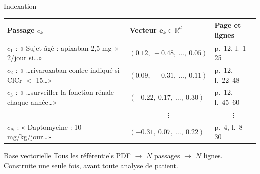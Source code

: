 \documentclass{beamer}
\begin{document}
\begin{frame}{Indexation}
  \centering
  \footnotesize
  \renewcommand{\arraystretch}{1.4}
  \begin{tabular}{>{\raggedright\arraybackslash}p{4.5cm}ll}
    \toprule
    \textbf{Passage $c_k$} & \textbf{Vecteur $\mathbf{e}_k \in \mathbb{R}^d$} & \textbf{Page et lignes} \\
    \midrule
    $c_1$ : « Sujet âgé : apixaban 2,5 mg $\times$ 2/jour si\dots » & $(0.12,\ -0.48,\ \dots,\ 0.05)$ & p.~12, l.~1--25 \\
    $c_2$ : « \dots rivaroxaban contre-indiqué si ClCr $<$ 15\dots » & $(0.09,\ -0.31,\ \dots,\ 0.11)$ & p.~12, l.~22--48 \\
    $c_3$ : « \dots surveiller la fonction rénale chaque année\dots » & $(-0.22,\ 0.17,\ \dots,\ 0.30)$ & p.~12, l.~45--60 \\
    \multicolumn{1}{c}{$\vdots$} & \multicolumn{1}{c}{$\vdots$} & \multicolumn{1}{c}{$\vdots$} \\
    $c_N$ : « Daptomycine : 10 mg/kg/jour\dots » & $(-0.31,\ 0.07,\ \dots,\ 0.22)$ & p.~4, l.~8--30 \\
    \bottomrule
  \end{tabular}

  \vspace{1em}
  \begin{exampleblock}{Base vectorielle}
    \centering
    Tous les référentiels PDF $\rightarrow$ $N$ passages $\rightarrow$ $N$ lignes. \\
    Construite une seule fois, avant toute analyse de patient.
  \end{exampleblock}
\end{frame}
\end{document}
